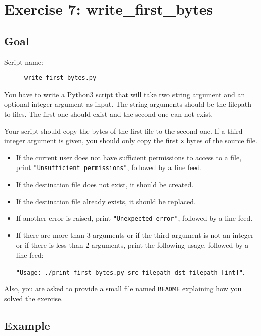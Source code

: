 \documentclass[12pt]{article}
\begin{document}
\section{Exercise 7: write\_first\_bytes}
\subsection{Goal}

\begin{description}
        \item[Script name:] \texttt{write\_first\_bytes.py}
\end{description}

You have to write a Python3 script that will take two string argument and an optional integer argument as input. The string arguments should be  the filepath to files. The first one should exist and the second one can not exist.

Your script should copy the bytes of the first file to the second one. If a third integer argument is given, you should only copy the first \texttt{x} bytes of the source file.

\begin{itemize}
\item If the current user does not have sufficient permissions to access to a file, print \texttt{"Unsufficient permissions"}, followed by a line feed.

\item If the destination file does not exist, it should be created.

\item If the destination file already exists, it should be replaced.

\item If another error is raised, print \texttt{"Unexpected error"}, followed by a line feed.

\item If there are more than 3 arguments or if the third argument is not an integer or if there is less than 2 arguments, print the following usage, followed by a line feed:

\texttt{"Usage: ./print\_first\_bytes.py src\_filepath dst\_filepath [int]"}.
\end{itemize}

Also, you are asked to provide a small file named \texttt{README} explaining how you solved the exercise.

\subsection{Example}
\end{document}

